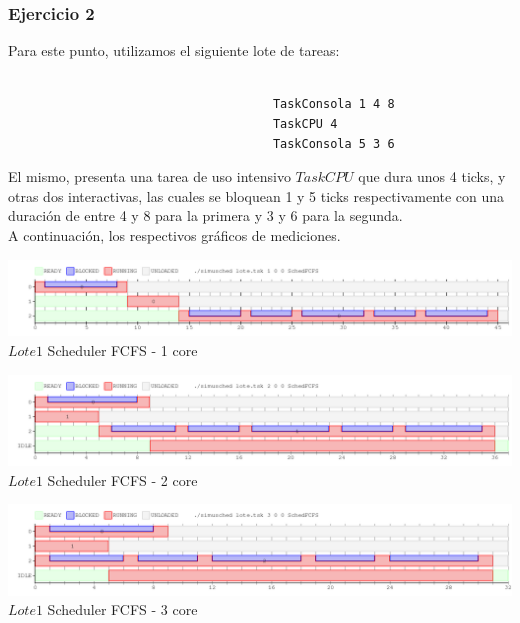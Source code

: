\subsubsection[Resolución Ejercicio 2]{Ejercicio 2}

\indent Para este punto, utilizamos el siguiente lote de tareas:
\begin{verbatim}
 
                                     TaskConsola 1 4 8
                                     TaskCPU 4
                                     TaskConsola 5 3 6

\end{verbatim}

\indent El mismo, presenta una tarea de uso intensivo $TaskCPU$ que dura unos 4 ticks, y otras dos interactivas, las cuales se
bloquean 1 y 5 ticks respectivamente con una duración de entre 4 y 8 para la primera y 3 y 6 para la segunda.\\
A continuación, los respectivos gráficos de mediciones.


\vspace*{0.3cm} \vspace*{0.3cm}
  \begin{center}
 \includegraphics[scale=0.5]{ejercicio2-1nucleo.png}
 { $Lote 1$ Scheduler FCFS - 1 core }
 \end{center}
  \vspace*{0.3cm}


\vspace*{0.3cm} \vspace*{0.3cm}
  \begin{center}
 \includegraphics[scale=0.5]{ejercicio2-2nucleo.png}
 { $Lote 1$ Scheduler FCFS - 2 core }
 \end{center}
  \vspace*{0.3cm}

\vspace*{0.3cm} \vspace*{0.3cm}
  \begin{center}
 \includegraphics[scale=0.5]{ejercicio2-3nucleo.png}
  {$Lote 1$ Scheduler FCFS - 3 core }
 \end{center}
  \vspace*{0.3cm}

